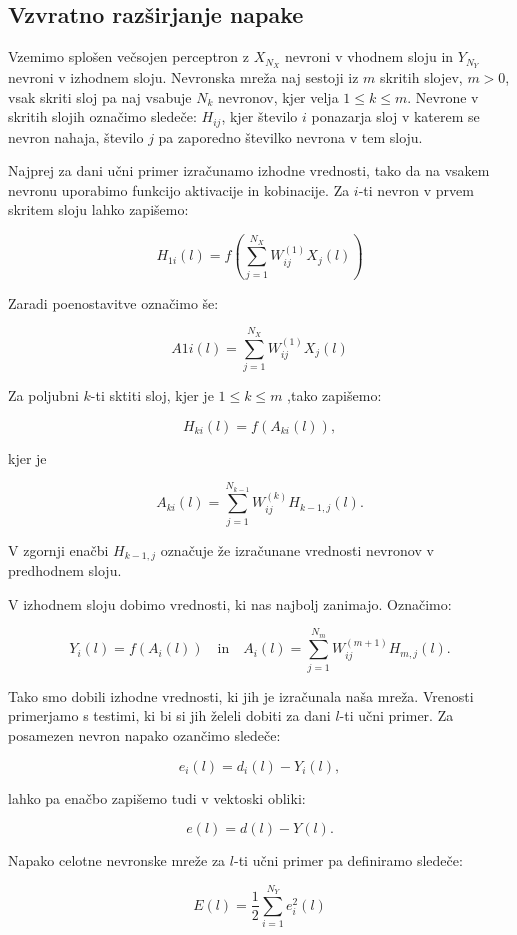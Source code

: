 \documentclass[mat1]{fmfdelo}
\begin{document}
\subsection{Vzvratno razširjanje napake}


Vzemimo splošen večsojen perceptron z $X_{N_X}$ nevroni v vhodnem sloju in $Y_{N_Y}$ nevroni v izhodnem sloju. Nevronska mreža naj sestoji iz $m$ skritih slojev, $m>0$, vsak skriti sloj pa naj vsabuje $N_k$ nevronov, kjer velja $1\leq k \leq m$. Nevrone v skritih slojih označimo sledeče: $H_{ij}$, kjer število $i$ ponazarja sloj v katerem se nevron nahaja, število $j$ pa zaporedno številko nevrona v tem sloju. 

Najprej za dani učni primer izračunamo izhodne vrednosti, tako da na vsakem nevronu uporabimo funkcijo aktivacije in kobinacije. Za $i$-ti nevron v prvem skritem sloju lahko zapišemo:

\[ H_{1i}(l) = f\left( \sum^{N_X}_{j=1}{W^{(1)}_{ij}X_j(l)}\right)  \]

Zaradi poenostavitve označimo še:

\[A{1i}(l) =\sum^{N_X}_{j=1}{W^{(1)}_{ij}X_j(l)} \]

Za poljubni $k$-ti sktiti sloj, kjer je $1\leq k \leq m$ ,tako zapišemo:

\[ H_{ki}(l) = f(A_{ki}(l)), \] 

kjer je

\[A_{ki}(l) = \sum^{N_{k-1}}_{j=1}{W^{(k)}_{ij}H_{k-1,j}(l)}.\]

V zgornji enačbi $H_{k-1,j}$ označuje že izračunane vrednosti nevronov v predhodnem sloju.
 
 V izhodnem sloju dobimo vrednosti, ki nas najbolj zanimajo. Označimo:

\[  Y_{i}(l) = f(A_{i}(l)) \quad \text{in} \quad A_{i}(l) = \sum^{N_{m}}_{j=1}{W^{(m+1)}_{ij}H_{m,j}(l)}.   \]

Tako smo dobili izhodne vrednosti, ki jih je izračunala naša mreža. Vrenosti primerjamo s testimi, ki bi si jih želeli dobiti za dani $l$-ti učni primer. Za posamezen nevron napako ozančimo sledeče:

\[e_i(l) = d_i(l) - Y_i(l), \]

lahko pa enačbo zapišemo tudi v vektoski obliki:

\[e(l) = d(l) - Y(l).\]

Napako celotne nevronske mreže za $l$-ti učni primer pa definiramo sledeče:

\begin{equation}
E(l) = \frac{1}{2}\sum^{N_Y}_{i=1}e_i^2(l)
\label{napaka}
\end{equation}
\end{document}
